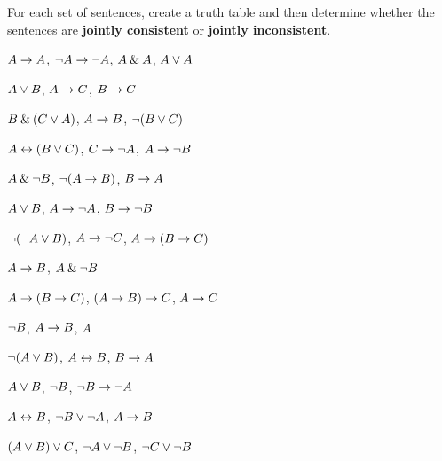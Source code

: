 \problempart
\label{pr.TT.consistent}
For each set of sentences, create a truth table and then determine whether the sentences are \textbf{jointly consistent} or \textbf{jointly inconsistent}.
\begin{earg}
\item $A\rightarrow A$, ${\neg} A \rightarrow {\neg} A$, $A\mathbin{\&} A$, $A\vee A$ %
\item $A\vee B$, $A\rightarrow C$, $B\rightarrow C$ %
\item $B\mathbin{\&}(C\vee A)$, $A\rightarrow B$, ${\neg}(B\vee C)$  %
\item $A\leftrightarrow(B\vee C)$, $C\rightarrow {\neg} A$, $A\rightarrow {\neg} B$ %

\item $A \mathbin{\&} {\neg} B$, ${\neg}(A \rightarrow B)$, $B \rightarrow A$\vspace{.5ex} %
\item $A \vee B$, $A \rightarrow {\neg} A$, $B \rightarrow {\neg} B$ \vspace{.5ex}%
\item ${\neg}({\neg} A \vee B) $, $A \rightarrow {\neg} C$, $A \rightarrow (B \rightarrow C)$\vspace{.5ex} %
\item $A \rightarrow B$, $A \mathbin{\&} {\neg} B$\vspace{.5ex} %
\item $A \rightarrow (B \rightarrow C)$, $(A \rightarrow B) \rightarrow C$, $A \rightarrow C$\vspace{.5ex} %

\item ${\neg} B$, $A \rightarrow B$, $A$ \vspace{.5ex}%
\item ${\neg}(A \vee B)$, $A \leftrightarrow B$, $B \rightarrow A$\vspace{.5ex} %
\item $A \vee B$, ${\neg} B$, ${\neg} B \rightarrow {\neg} A$\vspace{.5ex} %
\item $A \leftrightarrow B$, ${\neg} B \vee {\neg} A$, $A \rightarrow B$\vspace{.5ex} %
\item $(A \vee B) \vee C$, ${\neg} A \vee {\neg} B$, ${\neg} C \vee {\neg} B$\vspace{.5ex} %
\end{earg}


